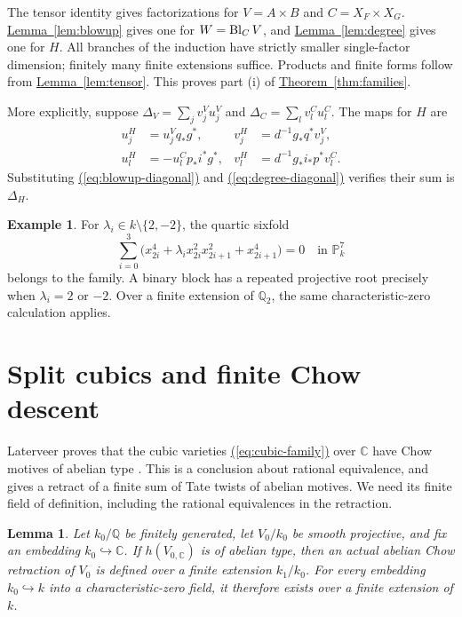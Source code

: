 \documentclass[11pt,a4paper]{article}
\newtheorem{lemma}[theorem]{Lemma}
\theoremstyle{definition}
\newtheorem{example}[theorem]{Example}
\theoremstyle{remark}\newtheorem{remark}[theorem]{Remark}
\numberwithin{equation}{section}
\newcommand{\Q}{\mathbb Q}\newcommand{\R}{\mathbb R}\newcommand{\C}{\mathbb C}
\newcommand{\PP}{\mathbb P}\newcommand{\LL}{\mathbb L}
\newcommand{\thmref}[1]{\hyperref[#1]{\textcolor{resultlink}{Theorem~\ref*{#1}}}}
\newcommand{\lemref}[1]{\hyperref[#1]{\textcolor{resultlink}{Lemma~\ref*{#1}}}}
\renewcommand{\eqref}[1]{\hyperref[#1]{\textcolor{equationlink}{(\ref*{#1})}}}
\begin{document}
The tensor identity gives factorizations for $V=A\times B$ and
$C=X_F\times X_G$. \lemref{lem:blowup} gives one for $W=\operatorname{Bl}_CV$,
and \lemref{lem:degree} gives one for $H$. All branches of the
induction have strictly smaller single-factor dimension; finitely
many finite extensions suffice. Products and finite forms follow
from \lemref{lem:tensor}. This proves part (i) of
\thmref{thm:families}.

More explicitly, suppose
$\Delta_V=\sum_jv_j^Vu_j^V$ and $\Delta_C=\sum_l v_l^Cu_l^C$.
The maps for $H$ are
\begin{align}
 u_j^H&=u_j^Vq_*g^*,& v_j^H&=d^{-1}g_*q^*v_j^V,\label{eq:ambient-recursion}\\
 u_l^H&=-u_l^Cp_*i^*g^*,& v_l^H&=d^{-1}g_*i_*p^*v_l^C.
 \label{eq:center-recursion}
\end{align}
Substituting \eqref{eq:blowup-diagonal} and
\eqref{eq:degree-diagonal} verifies their sum is $\Delta_H$.

\begin{example}
For $\lambda_i\in k\setminus\{2,-2\}$, the quartic sixfold
\[
 \sum_{i=0}^{3}
 \bigl(x_{2i}^4+\lambda_i x_{2i}^2x_{2i+1}^2+x_{2i+1}^4\bigr)=0
       \quad\text{in }\PP^7_k
\]
belongs to the family. A binary block has a repeated projective
root precisely when $\lambda_i=2$ or $-2$. Over a finite extension
of $\Q_2$, the same characteristic-zero calculation applies.
\end{example}

\section{Split cubics and finite Chow descent}\label{sec:cubic}

Laterveer proves that the cubic varieties
\eqref{eq:cubic-family} over $\C$ have Chow motives of abelian
type \cite[Theorem 5]{Laterveer}. This is a conclusion about
rational equivalence, and gives a retract of a finite sum of
Tate twists of abelian motives. We need its finite field of
definition, including the rational equivalences in the retraction.

\begin{lemma}\label{lem:descent}
Let $k_0/\Q$ be finitely generated, let $V_0/k_0$ be smooth
projective, and fix an embedding $k_0\hookrightarrow\C$.
If $h(V_{0,\C})$ is of abelian type, then an actual abelian
Chow retraction of $V_0$ is defined over a finite extension
$k_1/k_0$. For every embedding $k_0\hookrightarrow k$ into
a characteristic-zero field, it therefore exists over a finite
extension of $k$.
\end{lemma}
\end{document}
